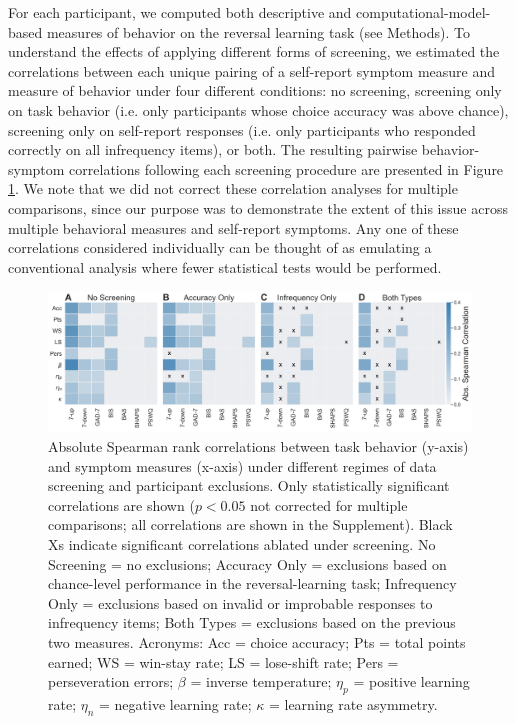 \documentclass[a4paper,notitlepage,12pt]{article}
\begin{document}
\begin{refsection}[main]
For each participant, we computed both descriptive and computational-model-based measures of behavior on the reversal learning task (see Methods). To understand the effects of applying different forms of screening, we estimated the correlations between each unique pairing of a self-report symptom measure and measure of behavior under four different conditions: no screening, screening only on task behavior (i.e. only participants whose choice accuracy was above chance), screening only on self-report responses (i.e. only participants who responded correctly on all infrequency items), or both. The resulting pairwise behavior-symptom correlations following each screening procedure are presented in Figure \ref{fig:correlations}. We note that we did not correct these correlation analyses for multiple comparisons, since our purpose was to demonstrate the extent of this issue across multiple behavioral measures and self-report symptoms. Any one of these correlations considered individually can be thought of as emulating a conventional analysis where fewer statistical tests would be performed.

\begin{figure}[!t]
\includegraphics[width=17cm]{../figures/main_03a.png}
\centering
\captionsetup{width=0.88\textwidth}
\caption{Absolute Spearman rank correlations between task behavior (y-axis) and symptom measures (x-axis) under different regimes of data screening and participant exclusions. Only statistically significant correlations are shown ($p<0.05$ not corrected for multiple comparisons; all correlations are shown in the Supplement). Black Xs indicate significant correlations ablated under screening. No Screening = no exclusions; Accuracy Only = exclusions based on chance-level performance in the reversal-learning task; Infrequency Only = exclusions based on invalid or improbable responses to infrequency items; Both Types = exclusions based on the previous two measures. Acronyms: Acc = choice accuracy; Pts = total points earned; WS = win-stay rate; LS = lose-shift rate; Pers = perseveration errors; $\beta$ = inverse temperature; $\eta_p$ = positive learning rate; $\eta_n$ = negative learning rate; $\kappa$ = learning rate asymmetry.}
\label{fig:correlations}
\end{figure}


\end{refsection}
\end{document}
